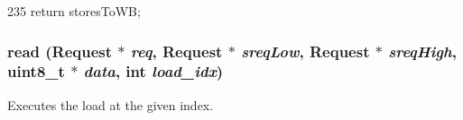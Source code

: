 \begin{DoxyCode}
235 { return storesToWB; }
\end{DoxyCode}
\hypertarget{classLSQUnit_a6f61d3e96e7ebc628121a63027d9c106}{
\subsubsection[{read}]{ read ({\bf Request} $\ast$ {\em req}, \/  {\bf Request} $\ast$ {\em sreqLow}, \/  {\bf Request} $\ast$ {\em sreqHigh}, \/  uint8\_\-t $\ast$ {\em data}, \/  int {\em load\_\-idx})}}
\label{classLSQUnit_a6f61d3e96e7ebc628121a63027d9c106}
Executes the load at the given index. 


